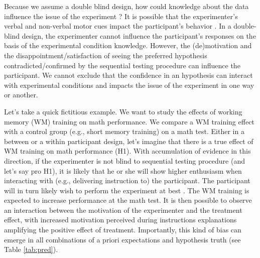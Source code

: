 \documentclass[a4paper,man,natbib,floatsintext,donotrepeattitle]{apa6}
\begin{document}
Because we assume a double blind design, how could knowledge about the data influence the issue of the experiment ? It is possible that the experimenter's verbal and non-verbal motor cues impact the participant's behavior \citep{zoble_interaction_1969}. In a double-blind design, the experimenter cannot influence the participant's responses on the basis of the experimental condition knowledge. However, the (de)motivation and the disappointment/satisfaction of seeing the preferred hypothesis contradicted/confirmed by the sequential testing procedure can influence the participant. We cannot exclude that the confidence in an hypothesis can interact with experimental conditions and impacts the issue of the experiment in one way or another.\par

Let's take a quick fictitious example. We want to study the effects of working memory (WM) training on math performance. We compare a WM training effect with a control group (e.g., short memory training) on a math test. Either in a between or a within participant design, let's imagine that there is a true effect of WM training on math performance (H1). With accumulation of evidence in this direction, if the experimenter is not blind to sequential testing procedure (and let's say pro H1), it is likely that he or she will show higher enthusiasm when interacting with (e.g., delivering instruction to) the participant. The participant will in turn likely wish to perform the experiment at best \citep{zoble_interaction_1969}. The WM training is expected to increase performance at the math test. It is then possible to observe an interaction between the motivation of the experimenter and the treatment effect, with increased motivation perceived during instructions explanations amplifying the positive effect of treatment. Importantly, this kind of bias can emerge in all combinations of a priori expectations and hypothesis truth (see Table \ref{tab:pred}). \par


\end{document}
